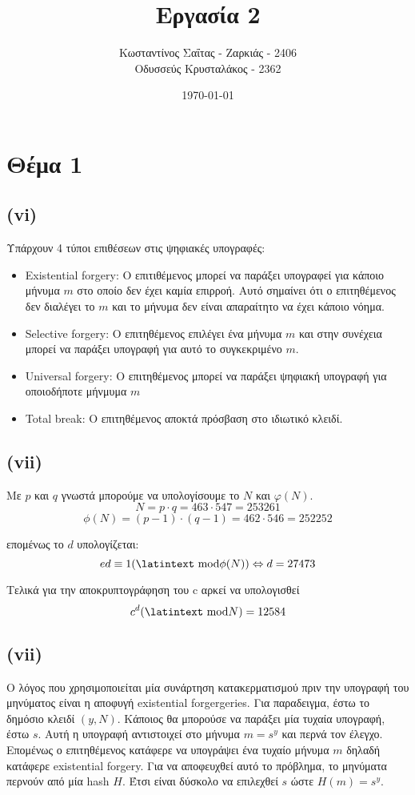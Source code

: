 \documentclass[a4paper, 11pt]{article}
\title{Εργασία 2}
\author{Κωσταντίνος Σαΐτας - Ζαρκιάς - 2406 \\ Οδυσσεύς Κρυσταλάκος - 2362}
\date{\today}
\newcommand{\lt}{\latintext}
\begin{document}
\maketitle

\section*{Θέμα 1}
\subsection*{({\lt vi})}
Υπάρχουν 4 τύποι επιθέσεων στις ψηφιακές υπογραφές:
\begin{itemize}
	\item {\lt Existential forgery}: Ο επιτιθέμενος μπορεί να παράξει υπογραφεί για κάποιο μήνυμα $m$ στο οποίο δεν έχει καμία επιρροή. Αυτό σημαίνει ότι ο επιτηθέμενος δεν διαλέγει το $m$ και το μήνυμα δεν είναι απαραίτητο να έχει κάποιο νόημα.
	\item {\lt Selective forgery}: Ο επιτηθέμενος επιλέγει ένα μήνυμα $m$ και στην συνέχεια μπορεί να παράξει υπογραφή για αυτό το συγκεκριμένο $m$.
	\item {\lt Universal forgery}: Ο επιτηθέμενος μπορεί να παράξει ψηφιακή υπογραφή για οποιοδήποτε μήνμυμα $m$
	\item {\lt Total break}: Ο επιτηθέμενος αποκτά πρόσβαση στο ιδιωτικό κλειδί.
\end{itemize}

\subsection*{({\lt vii})}
Με $p$ και $q$ γνωστά μπορούμε να υπολογίσουμε το $N$ και $φ(N)$.
\[N = p \cdot q = 463 \cdot 547 = 253261\]
\[\phi(N) = (p-1)\cdot(q-1) = 462 \cdot 546 = 252252\]

επομένως το $d$ υπολογίζεται:
\[ed\equiv1(\textrm{\lt mod} \phi(N)) \Leftrightarrow d = 27473 \]

Τελικά για την αποκρυπτογράφηση του c αρκεί να υπολογισθεί
\[ c^d (\textrm{\lt mod} N) = 12584\]

\subsection*{({\lt vii})}
Ο λόγος που χρησιμοποιείται μία συνάρτηση κατακερματισμού πριν την υπογραφή του μηνύματος είναι η αποφυγή {\lt existential forgergeries}. Για παραδειγμα, έστω το δημόσιο κλειδί $(y, N)$. Κάποιος θα μπορούσε να παράξει μία τυχαία υπογραφή, έστω $s$. Αυτή η υπογραφή αντιστοιχεί στο μήνυμα $m = s^y$ και περνά τον έλεγχο. Επομένως ο επιτηθέμενος κατάφερε να υπογράψει ένα τυχαίο μήνυμα $m$ δηλαδή κατάφερε {\lt existential forgery}. Για να αποφευχθεί αυτό το πρόβλημα, το μηνύματα περνούν από μία {\lt hash} $Η$. Έτσι είναι δύσκολο να επιλεχθεί $s$ ώστε $Η(m) = s^y$.
\end{document}
